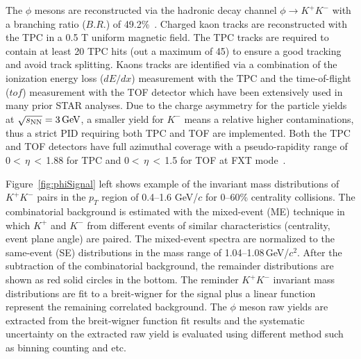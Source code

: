 \documentclass[%
 reprint,	
showpacs,
 amsmath,amssymb,
 aps,
 prc,
]{revtex4-1}
\begin{document}
The $\phi$ mesons are reconstructed via the hadronic decay channel $\phi\rightarrow K^+K^-$ with a branching ratio ($B.R.$) of 49.2\%~\cite{pdg}. Charged kaon tracks are reconstructed with the TPC in a 0.5 T uniform magnetic field. The TPC tracks are required to contain at least 20 TPC hits (out a maximum of 45) to ensure a good tracking and avoid track splitting. Kaons tracks are identified via a combination of the ionization energy loss ($dE/dx$) measurement with the TPC and the time-of-flight ($tof$) measurement with the TOF detector which have been extensively used in many prior STAR analyses. Due to the charge asymmetry for the particle yields at ${\sqrt{s_{\rm NN}} = \rm{3\,GeV}}$, a smaller yield for $K^-$ means a relative higher contaminations, thus a strict PID requiring both TPC and TOF are implemented. Both the TPC and TOF detectors have full azimuthal coverage with a pseudo-rapidity range of 0$<$\,$\eta$\,$<$\,1.88 for TPC and 0$<$\,$\eta$\,$<$\,1.5 for TOF at FXT mode~\cite{TPC,TOF}.



Figure~\ref{fig:phiSignal} left shows example of the invariant mass distributions of $K^+K^-$ pairs in the $p_{T}$ region of 0.4--1.6 GeV/$c$ for 0--60\% centrality collisions. The combinatorial background is estimated with the mixed-event (ME) technique in which $K^+$ and $K^-$ from different events of similar characteristics (centrality, event plane angle) are paired. The mixed-event spectra are normalized to the same-event (SE) distributions in the mass range of 1.04--1.08\,GeV/$c^2$. After the subtraction of the combinatorial background, the remainder distributions are shown as red solid circles in the bottom. The reminder $K^+K^-$ invariant mass distributions are fit to a breit-wigner for the signal plus a linear function represent the remaining correlated background. The $\phi$ meson raw yields are extracted from the breit-wigner function fit results and the systematic uncertainty on the extracted raw yield is evaluated using different method such as binning counting and etc.
\end{document}
